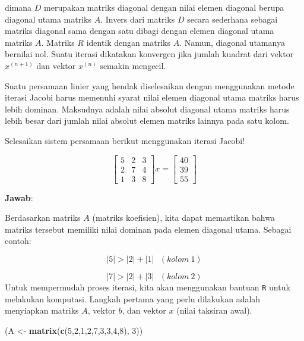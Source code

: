 \documentclass[]{book}
\newenvironment{Shaded}{\begin{snugshade}}{\end{snugshade}}
\newcommand{\DecValTok}[1]{\textcolor[rgb]{0.00,0.00,0.81}{#1}}
\newcommand{\KeywordTok}[1]{\textcolor[rgb]{0.13,0.29,0.53}{\textbf{#1}}}
\newcommand{\NormalTok}[1]{#1}
\newcommand{\StringTok}[1]{\textcolor[rgb]{0.31,0.60,0.02}{#1}}
\theoremstyle{definition}
\theoremstyle{definition}
\theoremstyle{definition}
\theoremstyle{remark}
\let\BeginKnitrBlock\begin \let\EndKnitrBlock\end
\begin{document}
dimana \(D\) merupakan matriks diagonal dengan nilai elemen diagonal berupa diagonal utama matriks \(A\). Invers dari matriks \(D\) secara sederhana sebagai matriks diagonal sama dengan satu dibagi dengan elemen diagonal utama matriks \(A\). Matriks \(R\) identik dengan matriks \(A\). Namun, diagonal utamanya bernilai nol. Suatu iterasi dikatakan konvergen jika jumlah kuadrat dari vektor \(x^{\left(n+1\right)}\) dan vektor \(x^{\left(n\right)}\) semakin mengecil.

Suatu persamaan linier yang hendak diselesaikan dengan menggunakan metode iterasi Jacobi harus memenuhi syarat nilai elemen diagonal utama matriks harus lebih dominan. Maksudnya adalah nilai absolut diagonal utama matriks harus lebih besar dari jumlah nilai absolut elemen matriks lainnya pada satu kolom.

\BeginKnitrBlock{example}
\protect\hypertarget{exm:jacobiexm}{}{\label{exm:jacobiexm} }Selesaikan sistem persamaan berikut menggunakan iterasi Jacobi!
\EndKnitrBlock{example}

\begin{equation*}
\begin{bmatrix}
     5 & 2 & 3     \\[0.3em]
     2 & 7 & 4     \\[0.3em]
     1 & 3 & 8
\end{bmatrix}
x = \begin{bmatrix}
     40     \\[0.3em]
     39     \\[0.3em]
     55
\end{bmatrix}
\end{equation*}

\textbf{Jawab}:

Berdasarkan matriks \(A\) (matriks koefisien), kita dapat memastikan bahwa matriks tersebut memiliki nilai dominan pada elemen diagonal utama. Sebagai contoh:

\[
\left|5\right|>\left|2\right|+\left|1\right|\ \ \ \left(kolom\ 1\right)
\]

\[
\left|7\right|>\left|2\right|+\left|3\right|\ \ \ \left(kolom\ 2\right)
\]
Untuk mempermudah proses iterasi, kita akan menggunakan bantuan \texttt{R} untuk melakukan komputasi. Langkah pertama yang perlu dilakukan adalah menyiapkan matriks \(A\), vektor \(b\), dan vektor \(x\) (nilai taksiran awal).

\begin{Shaded}
\begin{Highlighting}[]
\NormalTok{(A <-}\StringTok{ }\KeywordTok{matrix}\NormalTok{(}\KeywordTok{c}\NormalTok{(}\DecValTok{5}\NormalTok{,}\DecValTok{2}\NormalTok{,}\DecValTok{1}\NormalTok{,}\DecValTok{2}\NormalTok{,}\DecValTok{7}\NormalTok{,}\DecValTok{3}\NormalTok{,}\DecValTok{3}\NormalTok{,}\DecValTok{4}\NormalTok{,}\DecValTok{8}\NormalTok{), }\DecValTok{3}\NormalTok{))}
\end{Highlighting}
\end{Shaded}
\end{document}
